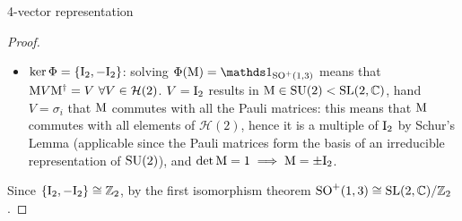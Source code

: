 \begin{observation}{4-vector representation}{}
\begin{proofbox}
\begin{proof}
\begin{itemize}
{\begin{equation*}
\begin{bmatrix}
            \end{bmatrix}
            =
            \begin{pmatrix}
              e^{2a} (v^0 - v^3) & - v^1 + \img v^2 \\
              - v^1 - \img v^2 & e^{-2a} (v^0 + v^3)
            \end{pmatrix}
          \end{equation*}
          i.e. $ v^0 \pm v^3 \mapsto e^{\mp 2a} (v^0 \pm v^3) $ and $ (v^1 , v^2) \mapsto (v^1 , v^2) $, which is equivalent to:
          \begin{equation*}
            \begin{pmatrix}
              v^0 \\ v^3
            \end{pmatrix}
            \mapsto
            \begin{bmatrix}
              \cosh \eta & - \sinh \eta \\
              - \sinh \eta & \cosh \eta
            \end{bmatrix}
            \begin{pmatrix}
              v^0 \\ v^3
            \end{pmatrix}
          \end{equation*}
        which is exactly the Lorentz transformation realizing a boost along the $ z $-axis.
      } a boost along the direction $ \hat{\ve{a}} $ of rapidity $ 2a $, all generators of $ \lorg $ are represented by $ \Phi $, i.e. $ \im\{\Phi\} = \lorg $.
    \item $ \ker \Phi = \{\mathrm{I}_2 , -\mathrm{I}_2\} $: solving $ \Phi(\mt{M}) = \id_{\lorg} $ means that $ \mathrm{M} V \mathrm{M}^\dagger = V \,\, \forall V \in \mathcal{H}(2) $. $ V = \mathrm{I}_2 $ results in $ \mathrm{M} \in \mathrm{SU}(2) < \mathrm{SL}(2,\mathbb{C}) $, hand $ V = \sigma_i $ that $ \mathrm{M} $ commutes with all the Pauli matrices: this means that $ \mathrm{M} $ commutes with all elements of $ \mathcal{H}(2) $, hence it is a multiple of $ \mathrm{I}_2 $ by Schur's Lemma (applicable since the Pauli matrices form the basis of an irreducible representation of $ \mathrm{SU}(2) $), and $ \det \mathrm{M} = 1 \implies \mathrm{M} = \pm \mathrm{I}_2 $.
    \end{itemize}
    Since $ \{\mathrm{I}_2 , -\mathrm{I}_2\} \cong \mathbb{Z}_2 $, by the first isomorphism theorem $ \mathrm{SO}^+(1,3) \cong \mathrm{SL}(2,\mathbb{C}) / \mathbb{Z}_2 $.
  \end{proof}
\end{proofbox}


\end{observation}
